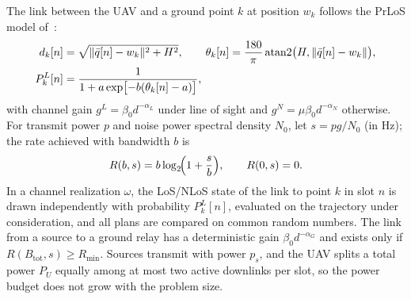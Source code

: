 The link between the UAV and a ground point $k$ at position $w_k$ follows the PrLoS model of~\cite{huang2025ddatsap}:
\begin{equation}
\label{eq:geometry}
\begin{aligned}
d_k[n]&=\sqrt{\lVert\bar q[n]-w_k\rVert^2+H^2},\qquad
\theta_k[n]=\frac{180}{\pi}\operatorname{atan2}\bigl(H,\lVert\bar q[n]-w_k\rVert\bigr),\\
P_k^{L}[n]&=\frac{1}{1+a\exp\bigl[-b(\theta_k[n]-a)\bigr]},
\end{aligned}
\end{equation}
with channel gain $g^{L}=\beta_0 d^{-\alpha_L}$ under line of sight and $g^{N}=\mu\beta_0 d^{-\alpha_N}$ otherwise. For transmit power $p$ and noise power spectral density $N_0$, let $s=pg/N_0$ (in Hz); the rate achieved with bandwidth $b$ is
\begin{equation}
\label{eq:rate}
R(b,s)=b\log_2\!\Bigl(1+\frac{s}{b}\Bigr),\qquad R(0,s)=0.
\end{equation}
In a channel realization $\omega$, the LoS/NLoS state of the link to point $k$ in slot $n$ is drawn independently with probability $P_k^{L}[n]$, evaluated on the trajectory under consideration, and all plans are compared on common random numbers. The link from a source to a ground relay has a deterministic gain $\beta_0 d^{-\alpha_G}$ and exists only if $R(B_{\mathrm{tot}},s)\ge R_{\min}$. Sources transmit with power $p_s$, and the UAV splits a total power $P_U$ equally among at most two active downlinks per slot, so the power budget does not grow with the problem size.
